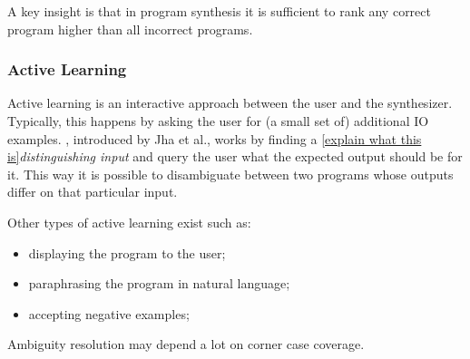  A key insight is that in program synthesis it
is sufficient to rank any correct program higher than all incorrect programs.

\subsubsection{Active Learning}

Active learning is an interactive approach between the user and the synthesizer.
Typically, this happens by asking the user for (a small set of) additional
\ac{IO} examples. ,
introduced by Jha et al.\cite{Jha:oracle:2010}, works by finding a \ref{explain
what this is}\textit{distinguishing input} and query the user what the expected
output should be for it. This way it is possible to disambiguate between two
programs whose outputs differ on that particular input.

Other types of active learning exist such as:
\begin{itemize}
\item displaying the program to the user;
\item paraphrasing the program in natural language;
\item accepting negative examples; 
\end{itemize}

 Ambiguity resolution may depend a lot on corner case coverage.


